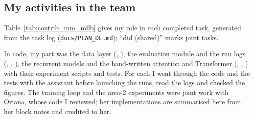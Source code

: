 \subsection{My activities in the team}

Table~\ref{tab:contrib_mm_mllb} gives my role in each completed task, generated from the task log
(\texttt{docs/PLAN\_DL.md}); ``did (shared)'' marks joint tasks.

\begin{table}[htbp]
\centering
\caption{My role in each completed task (generated from \texttt{docs/PLAN\_DL.md}).}
\label{tab:contrib_mm_mllb}

\end{table}

In code, my part was the data layer (, ), the evaluation module
and the run logs (, , ), the recurrent
models and the hand-written attention and Transformer (,
, ) with their experiment scripts and tests.
For each I went through the code and the tests with the assistant before launching the runs, read the
logs and checked the figures. The training loop and the area-2 experiments were joint work with Oriana,
whose code I reviewed; her implementations are summarised here from her block notes and credited to her.

